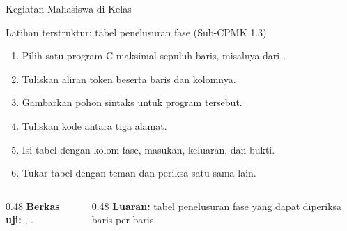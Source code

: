 \documentclass[aspectratio=169,10pt,t]{beamer}
\begin{document}
\begin{frame}{Kegiatan Mahasiswa di Kelas}
  \begin{block}{Latihan terstruktur: tabel penelusuran fase (Sub-CPMK 1.3)}
    \footnotesize
    \begin{enumerate}
      \setlength{\itemsep}{1pt}
      \item Pilih satu program C maksimal sepuluh baris, misalnya dari
            .
      \item Tuliskan aliran token beserta baris dan kolomnya.
      \item Gambarkan pohon sintaks untuk program tersebut.
      \item Tuliskan kode antara tiga alamat.
      \item Isi tabel dengan kolom fase, masukan, keluaran, dan bukti.
      \item Tukar tabel dengan teman dan periksa satu sama lain.
    \end{enumerate}
  \end{block}

  \vspace{4pt}
  \begin{columns}[T,onlytextwidth]
    \begin{column}{0.48\textwidth}
      {\footnotesize\textbf{Berkas uji:} ,
      .}
    \end{column}
    \begin{column}{0.48\textwidth}
      {\footnotesize\textbf{Luaran:} tabel penelusuran fase yang dapat
      diperiksa baris per baris.}
    \end{column}
  \end{columns}
\end{frame}
\end{document}
